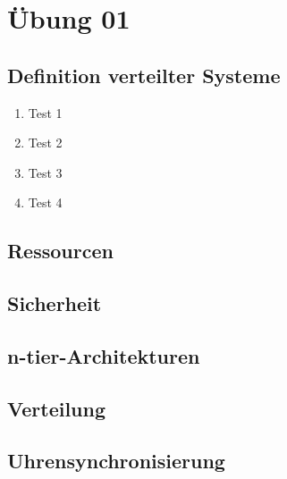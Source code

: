 \documentclass[a4paper]{scrartcl}
\begin{document}
\newpage

%
%

\thispagestyle{empty}

\tableofcontents

\newpage

%
%

\setcounter{page}{3}
\section{Übung 01}

\subsection{Definition verteilter Systeme}
	\begin{enumerate}[label=\alph*)]
		\item Test 1
		\item Test 2
		\item Test 3
		\item Test 4
	\end{enumerate}

\subsection{Ressourcen}

\subsection{Sicherheit}

\subsection{n-tier-Architekturen}

\subsection{Verteilung}

\subsection{Uhrensynchronisierung}
\end{document}
